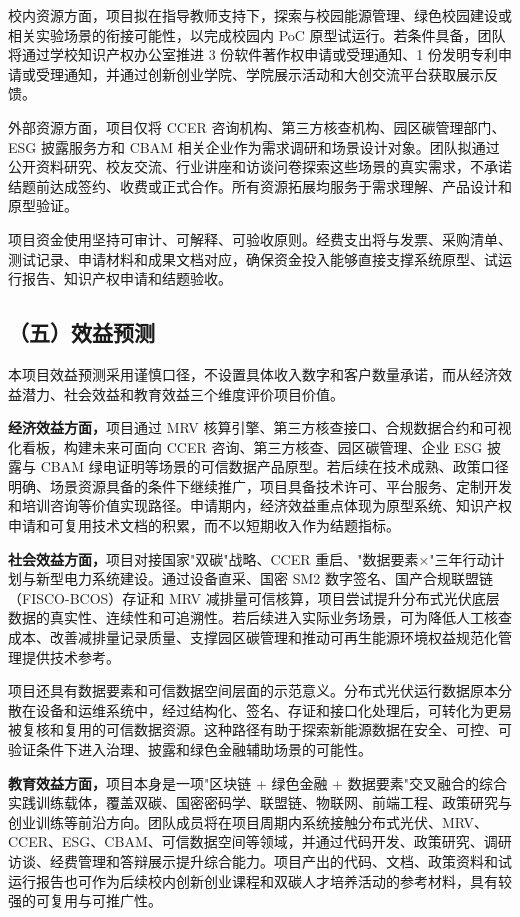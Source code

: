 \documentclass[12pt,a4paper]{article}
\begin{document}
校内资源方面，项目拟在指导教师支持下，探索与校园能源管理、绿色校园建设或相关实验场景的衔接可能性，以完成校园内 PoC 原型试运行。若条件具备，团队将通过学校知识产权办公室推进 3 份软件著作权申请或受理通知、1 份发明专利申请或受理通知，并通过创新创业学院、学院展示活动和大创交流平台获取展示反馈。

外部资源方面，项目仅将 CCER 咨询机构、第三方核查机构、园区碳管理部门、ESG 披露服务方和 CBAM 相关企业作为需求调研和场景设计对象。团队拟通过公开资料研究、校友交流、行业讲座和访谈问卷探索这些场景的真实需求，不承诺结题前达成签约、收费或正式合作。所有资源拓展均服务于需求理解、产品设计和原型验证。

项目资金使用坚持可审计、可解释、可验收原则。经费支出将与发票、采购清单、测试记录、申请材料和成果文档对应，确保资金投入能够直接支撑系统原型、试运行报告、知识产权申请和结题验收。


\subsection*{（五）效益预测}

本项目效益预测采用谨慎口径，不设置具体收入数字和客户数量承诺，而从经济效益潜力、社会效益和教育效益三个维度评价项目价值。

\textbf{经济效益方面，}项目通过 MRV 核算引擎、第三方核查接口、合规数据合约和可视化看板，构建未来可面向 CCER 咨询、第三方核查、园区碳管理、企业 ESG 披露与 CBAM 绿电证明等场景的可信数据产品原型。若后续在技术成熟、政策口径明确、场景资源具备的条件下继续推广，项目具备技术许可、平台服务、定制开发和培训咨询等价值实现路径。申请期内，经济效益重点体现为原型系统、知识产权申请和可复用技术文档的积累，而不以短期收入作为结题指标。

\textbf{社会效益方面，}项目对接国家"双碳"战略、CCER 重启、"数据要素×"三年行动计划与新型电力系统建设。通过设备直采、国密 SM2 数字签名、国产合规联盟链（FISCO-BCOS）存证和 MRV 减排量可信核算，项目尝试提升分布式光伏底层数据的真实性、连续性和可追溯性。若后续进入实际业务场景，可为降低人工核查成本、改善减排量记录质量、支撑园区碳管理和推动可再生能源环境权益规范化管理提供技术参考。

项目还具有数据要素和可信数据空间层面的示范意义。分布式光伏运行数据原本分散在设备和运维系统中，经过结构化、签名、存证和接口化处理后，可转化为更易被复核和复用的可信数据资源。这种路径有助于探索新能源数据在安全、可控、可验证条件下进入治理、披露和绿色金融辅助场景的可能性。

\textbf{教育效益方面，}项目本身是一项"区块链 + 绿色金融 + 数据要素"交叉融合的综合实践训练载体，覆盖双碳、国密密码学、联盟链、物联网、前端工程、政策研究与创业训练等前沿方向。团队成员将在项目周期内系统接触分布式光伏、MRV、CCER、ESG、CBAM、可信数据空间等领域，并通过代码开发、政策研究、调研访谈、经费管理和答辩展示提升综合能力。项目产出的代码、文档、政策资料和试运行报告也可作为后续校内创新创业课程和双碳人才培养活动的参考材料，具有较强的可复用与可推广性。
\end{document}
